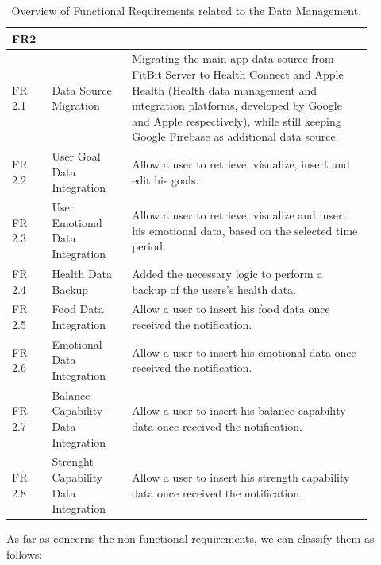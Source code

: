 \newpage

\begin{table}[h!]
    \setstretch{\myspacing}
    \centering
    \begin{tabular}{|>{\raggedright\arraybackslash}p{0.1\linewidth}|>{\raggedright\arraybackslash}p{0.2\linewidth}|>{\raggedright\arraybackslash}p{0.6\linewidth}|}
        \hline
        \textbf{FR2} & \multicolumn{2}{>{\centering\arraybackslash}p{0.7\linewidth}|}{\textbf{Data Management}} \\
        \hline
        FR 2.1 & Data Source Migration & Migrating the main app data source from FitBit Server to Health Connect and Apple Health (Health data management and integration platforms, developed by Google and Apple respectively), while still keeping Google Firebase as additional data source. \\
        \hline
        FR 2.2 & User Goal Data Integration & Allow a user to retrieve, visualize, insert and edit his goals. \\
        \hline
        FR 2.3 & User Emotional Data Integration & Allow a user to retrieve, visualize and insert his emotional data, based on the selected time period. \\
        \hline
        FR 2.4 & Health Data Backup & Added the necessary logic to perform a backup of the users's health data. \\
        \hline
        FR 2.5 & Food Data Integration & Allow a user to insert his food data once received the notification. \\
        \hline
        FR 2.6 & Emotional Data Integration & Allow a user to insert his emotional data once received the notification. \\
        \hline
        FR 2.7 & Balance Capability Data Integration & Allow a user to insert his balance capability data once received the notification. \\
        \hline
        FR 2.8 & Strenght Capability Data Integration & Allow a user to insert his strength capability data once received the notification. \\
        \hline
    \end{tabular}
    \caption{Overview of Functional Requirements related to the Data Management.}
    \label{tab:fr2}
\end{table}

\clearpage

\noindent As far as concerns the non-functional requirements, we can classify them as follows:

